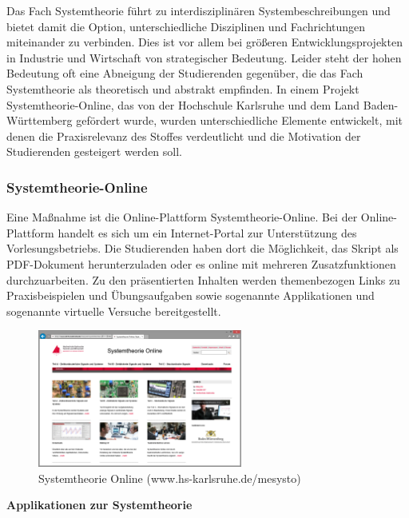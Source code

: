 \noindent Das Fach Systemtheorie f\"{u}hrt zu interdisziplin\"{a}ren Systembeschreibungen und bietet damit die Option, unterschiedliche Disziplinen und Fachrichtungen miteinander zu verbinden. Dies ist vor allem bei gr\"{o}{\ss}eren Entwicklungsprojekten in Industrie und Wirtschaft von strategischer Bedeutung. Leider steht der hohen Bedeutung oft eine Abneigung der Studierenden gegen\"{u}ber, die das Fach Systemtheorie als theoretisch und abstrakt empfinden. In einem Projekt Systemtheorie-Online, das von der Hochschule Karlsruhe und dem Land Baden-W\"{u}rttemberg gef\"{o}rdert wurde, wurden unterschiedliche Elemente entwickelt, mit denen die Praxisrelevanz des Stoffes verdeutlicht und die Motivation der Studierenden gesteigert werden soll. 


\subsubsection{Systemtheorie-Online}

\noindent Eine Ma{\ss}nahme ist die Online-Plattform Systemtheorie-Online. Bei der Online-Plattform handelt es sich um ein Internet-Portal zur Unterstützung des Vorlesungsbetriebs. Die Studierenden haben dort die Möglichkeit, das Skript als PDF-Dokument herunterzuladen oder es online mit mehreren Zusatzfunktionen durchzuarbeiten. Zu den präsentierten Inhalten werden themenbezogen Links zu Praxisbeispielen und Übungsaufgaben sowie sogenannte Applikationen und sogenannte virtuelle Versuche bereitgestellt.


\begin{figure}[H]
  \centerline{\includegraphics[width=0.6\textwidth]{Einleitung/Bilder/image6.png}}
  \caption{Systemtheorie Online (www.hs-karlsruhe.de/mesysto)}
  \label{fig:SySOnline}
\end{figure}

\medskip

{\selectfont
\noindent\textbf{Applikationen zur Systemtheorie}} \smallskip

